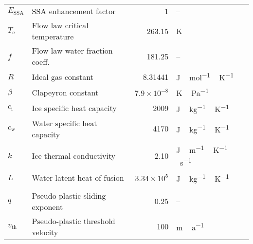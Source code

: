 \documentclass[tc, manuscript]{copernicus}
\begin{document}
\begin{table*}[p]
{\begin{tabular}{llrll}
        $E_{\text{SSA}}$   & SSA enhancement factor
                & 1
                & --
                & \citet[p.~77]{Cuffey.Paterson.2010} \\

        $T_{\mathrm{c}}$   & Flow law critical temperature
                & 263.15
                & K
                & \citet{Paterson.Budd.1982} \\

        $f$     & Flow law water fraction coeff.
                & 181.25
                & --
                & \citet{Lliboutry.Duval.1985} \\

        $R$     & Ideal gas constant
                & 8.31441
                & \unit{J\,mol^{-1}\,K^{-1}}
                & \citet[p.~72]{Cuffey.Paterson.2010} \\

        $\beta$ & Clapeyron constant
                & $7.9 \times 10^{-8}$
                & \unit{K\,Pa^{-1}}
                & \citet{Luthi.etal.2002} \\

        $c_{\mathrm{i}}$   & Ice specific heat capacity
                & 2009
                & \unit{J\,kg^{-1}\,K^{-1}}
                & \citet{Aschwanden.etal.2012} \\

        $c_{\mathrm{w}}$   & Water specific heat capacity
                & 4170
                & \unit{J\,kg^{-1}\,K^{-1}}
                & \citet{Aschwanden.etal.2012} \\

        $k$     & Ice thermal conductivity
                & 2.10
                & \unit{J\,m^{-1}\,K^{-1}\,s^{-1}}
                & \citet{Aschwanden.etal.2012} \\

        $L$     & Water latent heat of fusion
                & $3.34\times10^5$
                & \unit{J\,kg^{-1}\,K^{-1}}
                & \citet{Aschwanden.etal.2012} \\

        \middlehline
        \multicolumn{2}{l}{{Basal sliding}} \\
        \middlehline

        $q$     & Pseudo-plastic sliding exponent
                & 0.25
                & --
                & \citet{Aschwanden.etal.2013} \\

        $v_{\text{th}}$& Pseudo-plastic threshold velocity
                & 100
                & \unit{m\,a^{-1}}
                & \citet{Aschwanden.etal.2013} \\


\end{tabular}}
\end{table*}
\end{document}
